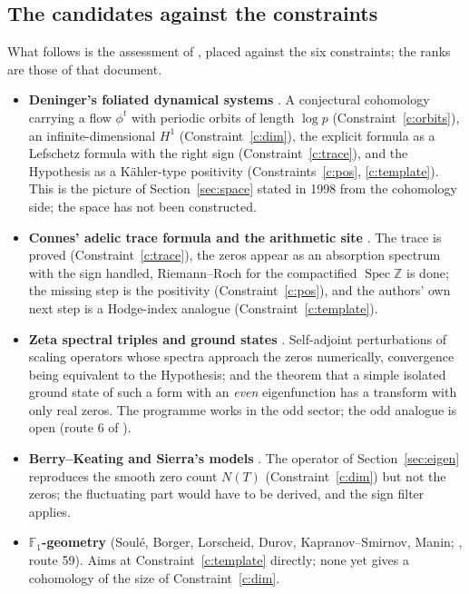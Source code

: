 \documentclass[11pt]{article}
\theoremstyle{definition}
\theoremstyle{remark}
\newcommand{\Z}{\mathbb Z}
\newcommand{\F}{\mathbb F}
\begin{document}
\subsection{The candidates against the constraints}
What follows is the assessment of \cite{routes}, placed against the six constraints; the ranks are those of that document.
\begin{itemize}
\item \textbf{Deninger's foliated dynamical systems} \cite{deninger}. A conjectural cohomology carrying a flow $\phi^t$ with periodic orbits of length $\log p$ (Constraint~\ref{c:orbits}), an infinite-dimensional $H^1$ (Constraint~\ref{c:dim}), the explicit formula as a Lefschetz formula with the right sign (Constraint~\ref{c:trace}), and the Hypothesis as a Kähler-type positivity (Constraints~\ref{c:pos}, \ref{c:template}). This is the picture of Section~\ref{sec:space} stated in 1998 from the cohomology side; the space has not been constructed.
\item \textbf{Connes' adelic trace formula and the arithmetic site} \cite{connes99,cc16}. The trace is proved (Constraint~\ref{c:trace}), the zeros appear as an absorption spectrum with the sign handled, Riemann--Roch for the compactified $\operatorname{Spec}\Z$ is done; the missing step is the positivity (Constraint~\ref{c:pos}), and the authors' own next step is a Hodge-index analogue (Constraint~\ref{c:template}).
\item \textbf{Zeta spectral triples and ground states} \cite{ccm25,cvs25}. Self-adjoint perturbations of scaling operators whose spectra approach the zeros numerically, convergence being equivalent to the Hypothesis; and the theorem that a simple isolated ground state of such a form with an \emph{even} eigenfunction has a transform with only real zeros. The programme works in the odd sector; the odd analogue is open (route 6 of \cite{routes}).
\item \textbf{Berry--Keating and Sierra's models} \cite{bk}. The operator of Section~\ref{sec:eigen} reproduces the smooth zero count $N(T)$ (Constraint~\ref{c:dim}) but not the zeros; the fluctuating part would have to be derived, and the sign filter applies.
\item \textbf{$\F_1$-geometry} (Soulé, Borger, Lorscheid, Durov, Kapranov--Smirnov, Manin; \cite{routes}, route 59). Aims at Constraint~\ref{c:template} directly; none yet gives a cohomology of the size of Constraint~\ref{c:dim}.
\end{itemize}
\end{document}
